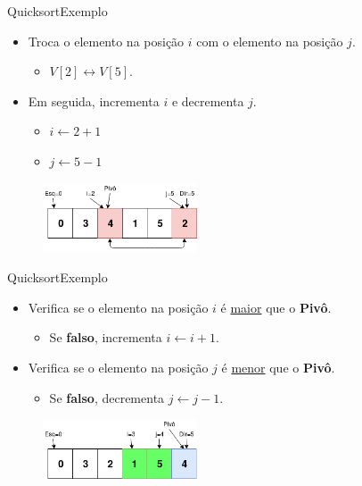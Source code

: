 \documentclass[aspectratio=169]{beamer}
\begin{document}
\begin{frame}{Quicksort}{Exemplo}
\begin{itemize}
 \item Troca o elemento na posição $i$ com o elemento na posição $j$.
 \begin{itemize}
 \item $V[2] \leftrightarrow V[5]$.
 \end{itemize}
 \item Em seguida, incrementa $i$ e decrementa $j$.
 \begin{itemize}
 \item $i \leftarrow 2 + 1$
 \item $j \leftarrow 5 - 1$ 
 \end{itemize} 
\end{itemize}

\begin{figure}[!h]
  \centering
  \includegraphics[width=130pt]{imgs/quick/quick19.png}
  \label{fig_quick19}
\end{figure}
\end{frame}


\begin{frame}{Quicksort}{Exemplo}
\begin{itemize}
 \item Verifica se o elemento na posição $i$ é \underline{maior} que o {\bf Pivô}.
  \begin{itemize}
 \item Se {\bf falso}, incrementa $i\leftarrow i + 1$.
 \end{itemize}
 \item Verifica se o elemento na posição $j$ é \underline{menor} que o {\bf Pivô}.
 \begin{itemize}
  \item Se {\bf falso}, decrementa $j\leftarrow j - 1$.
 \end{itemize}
\end{itemize}

\begin{figure}[!h]
  \centering
  \includegraphics[width=130pt]{imgs/quick/quick20.png}
  \label{fig_quick20}
\end{figure}
\end{frame}
\end{document}
